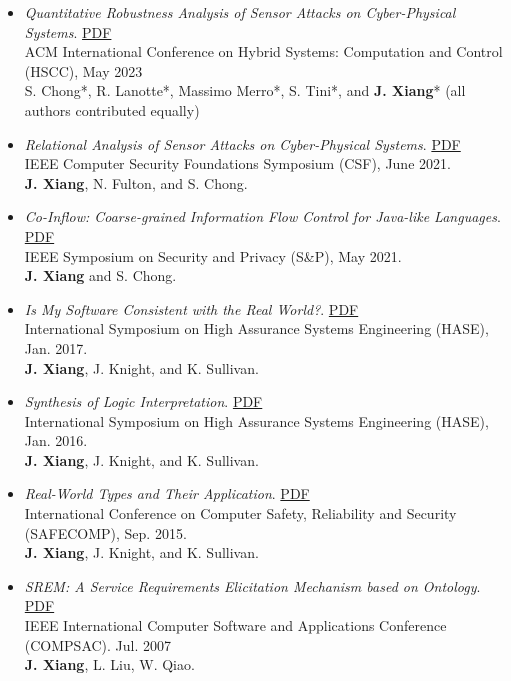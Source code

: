 \documentclass[11pt]{article}
\begin{document}
\begin{itemize}
\item \textit{Quantitative Robustness Analysis of Sensor Attacks on Cyber-Physical Systems}.
  \href{https://www.jianxiang.info/pub/HSCC23.pdf}{PDF} \\
  ACM International Conference on Hybrid Systems: Computation and Control (HSCC), May 2023 \\
  S. Chong*, R. Lanotte*, Massimo Merro*, S. Tini*, and \textbf{J. Xiang}*
  (all authors contributed equally)
\item \textit{Relational Analysis of Sensor Attacks on Cyber-Physical Systems}.  \href{https://www.jianxiang.info/pub/CSF21.pdf}{PDF} \\
  IEEE Computer Security Foundations Symposium (CSF),  June 2021. \\
  \textbf{J. Xiang}, N. Fulton, and S. Chong. 
  
\item \textit{Co-Inflow: Coarse-grained Information Flow Control for Java-like Languages}. \href{https://www.jianxiang.info/pub/SP21.pdf}{PDF} \\
  IEEE Symposium on Security and Privacy (S\&P), May 2021.  \\
  \textbf{J. Xiang} and S. Chong.
  
\item \textit{Is My Software Consistent with the Real World?}. \href{https://www.jianxiang.info/pub/HASE17.pdf}{PDF} \\
  International Symposium on High Assurance Systems Engineering (HASE), Jan. 2017.  \\
  \textbf{J. Xiang}, J. Knight, and K. Sullivan.

\item \textit{Synthesis of Logic Interpretation}. \href{https://www.jianxiang.info/pub/HASE16.pdf}{PDF}  \\
  International Symposium on High Assurance Systems Engineering (HASE), Jan. 2016. \\
  \textbf{J. Xiang}, J. Knight, and K. Sullivan.
  
\item \textit{Real-World Types and Their Application}. \href{https://www.jianxiang.info/pub/safecomp15.pdf}{PDF} \\
  International Conference on Computer Safety, Reliability and Security (SAFECOMP), Sep. 2015. \\
  \textbf{J. Xiang}, J. Knight, and K. Sullivan.
  
\item \textit{SREM: A Service Requirements Elicitation Mechanism based on Ontology}. \href{https://www.jianxiang.info/pub/compsac07.pdf}{PDF} \\
  IEEE International Computer Software and Applications Conference (COMPSAC). Jul. 2007 \\
  \textbf{J. Xiang}, L. Liu, W. Qiao.  
\end{itemize}
    
\end{document}

